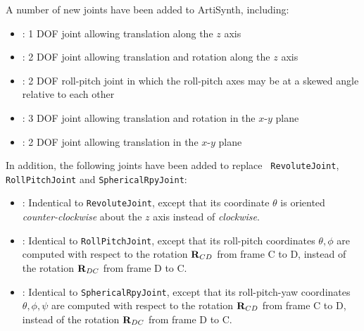 \documentclass{article}
\def\R{{\bf R}}
\begin{document}
A number of new joints have been added to ArtiSynth, including:

\begin{itemize}

\item
{}:
1 DOF joint allowing translation along the
$z$ axis

\item
{}:
2 DOF joint allowing translation and
rotation along the $z$ axis

\item
{}: 
2 DOF roll-pitch joint in which the roll-pitch axes may be at a
skewed angle relative to each other

\item
{}:
3 DOF joint allowing translation and
rotation in the $x$-$y$ plane

\item
{}: 
2 DOF joint allowing translation
in the $x$-$y$ plane

\end{itemize}

In addition, the following joints have been added to replace {\tt
RevoluteJoint}, {\tt RollPitchJoint} and {\tt SphericalRpyJoint}:

\begin{itemize}

\item {}: Indentical to
{\tt RevoluteJoint}, except that its coordinate $\theta$ is oriented
{\it counter-clockwise} about the $z$ axis instead of {\it clockwise}.

\item
{}:
Identical to {\tt RollPitchJoint}, except
that its roll-pitch coordinates $\theta, \phi$ are computed with
respect to the rotation $\R_{CD}$ from frame C to D, instead of the
rotation $\R_{DC}$ from frame D to C.

\item {}:
Identical to {\tt SphericalRpyJoint}, except that its roll-pitch-yaw
coordinates $\theta, \phi, \psi$ are computed with respect to the
rotation $\R_{CD}$ from frame C to D, instead of the rotation
$\R_{DC}$ from frame D to C.

\end{itemize}
\end{document}
